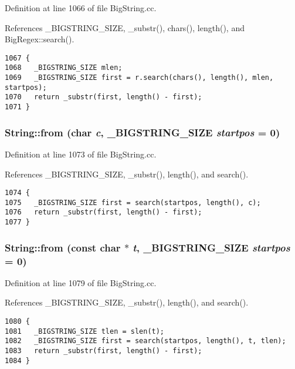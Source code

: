 Definition at line 1066 of file Big\-String.cc.

References \_\-BIGSTRING\_\-SIZE, \_\-substr(), chars(), length(), and Big\-Regex::search().



\footnotesize\begin{verbatim}1067 {
1068   _BIGSTRING_SIZE mlen;
1069   _BIGSTRING_SIZE first = r.search(chars(), length(), mlen, startpos);
1070   return _substr(first, length() - first);
1071 }
\end{verbatim}\normalsize 
{}
\subsubsection{ String::from (char {\em c}, {\bf \_\-BIGSTRING\_\-SIZE} {\em startpos} = 0)}\label{classString_a74}




Definition at line 1073 of file Big\-String.cc.

References \_\-BIGSTRING\_\-SIZE, \_\-substr(), length(), and search().



\footnotesize\begin{verbatim}1074 {
1075   _BIGSTRING_SIZE first = search(startpos, length(), c);
1076   return _substr(first, length() - first);
1077 }
\end{verbatim}\normalsize 
{}
\subsubsection{ String::from (const char $\ast$ {\em t}, {\bf \_\-BIGSTRING\_\-SIZE} {\em startpos} = 0)}\label{classString_a73}




Definition at line 1079 of file Big\-String.cc.

References \_\-BIGSTRING\_\-SIZE, \_\-substr(), length(), and search().



\footnotesize\begin{verbatim}1080 {
1081   _BIGSTRING_SIZE tlen = slen(t);
1082   _BIGSTRING_SIZE first = search(startpos, length(), t, tlen);
1083   return _substr(first, length() - first);
1084 }
\end{verbatim}\normalsize 
{}
